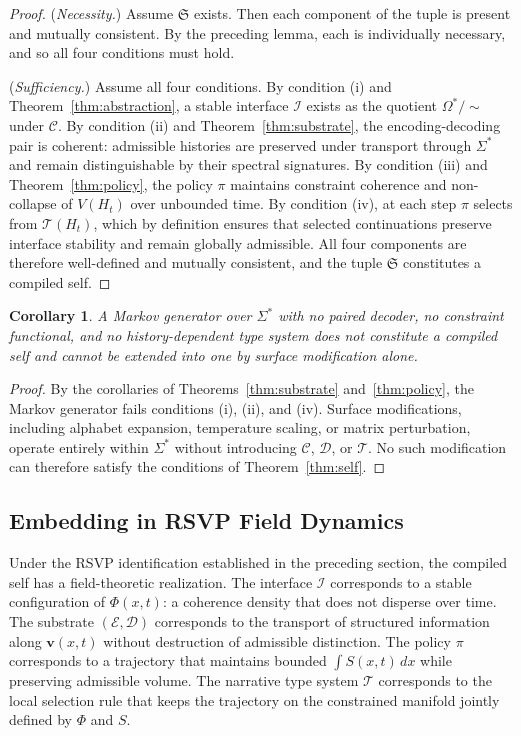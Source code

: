 \documentclass[12pt, a4paper]{article}
\theoremstyle{plain}
\newtheorem{corollary}[theorem]{Corollary}
\theoremstyle{definition}
\theoremstyle{remark}
\begin{document}
\begin{proof}
(\textit{Necessity.}) Assume $\mathfrak{S}$ exists. Then each component of the tuple is present and mutually consistent. By the preceding lemma, each is individually necessary, and so all four conditions must hold.

(\textit{Sufficiency.}) Assume all four conditions. By condition (i) and Theorem~\ref{thm:abstraction}, a stable interface $\mathcal{I}$ exists as the quotient $\Omega^*/{\sim}$ under $\mathcal{C}$. By condition (ii) and Theorem~\ref{thm:substrate}, the encoding-decoding pair is coherent: admissible histories are preserved under transport through $\Sigma^*$ and remain distinguishable by their spectral signatures. By condition (iii) and Theorem~\ref{thm:policy}, the policy $\pi$ maintains constraint coherence and non-collapse of $V(H_t)$ over unbounded time. By condition (iv), at each step $\pi$ selects from $\mathcal{T}(H_t)$, which by definition ensures that selected continuations preserve interface stability and remain globally admissible. All four components are therefore well-defined and mutually consistent, and the tuple $\mathfrak{S}$ constitutes a compiled self.
\end{proof}

\begin{corollary}
A Markov generator over $\Sigma^*$ with no paired decoder, no constraint functional, and no history-dependent type system does not constitute a compiled self and cannot be extended into one by surface modification alone.
\end{corollary}

\begin{proof}
By the corollaries of Theorems~\ref{thm:substrate} and~\ref{thm:policy}, the Markov generator fails conditions (i), (ii), and (iv). Surface modifications, including alphabet expansion, temperature scaling, or matrix perturbation, operate entirely within $\Sigma^*$ without introducing $\mathcal{C}$, $\mathcal{D}$, or $\mathcal{T}$. No such modification can therefore satisfy the conditions of Theorem~\ref{thm:self}.
\end{proof}

\subsection{Embedding in RSVP Field Dynamics}

Under the RSVP identification established in the preceding section, the compiled self has a field-theoretic realization. The interface $\mathcal{I}$ corresponds to a stable configuration of $\Phi(x,t)$: a coherence density that does not disperse over time. The substrate $(\mathcal{E}, \mathcal{D})$ corresponds to the transport of structured information along $\mathbf{v}(x,t)$ without destruction of admissible distinction. The policy $\pi$ corresponds to a trajectory that maintains bounded $\int S(x,t)\,dx$ while preserving admissible volume. The narrative type system $\mathcal{T}$ corresponds to the local selection rule that keeps the trajectory on the constrained manifold jointly defined by $\Phi$ and $S$.
\end{document}
